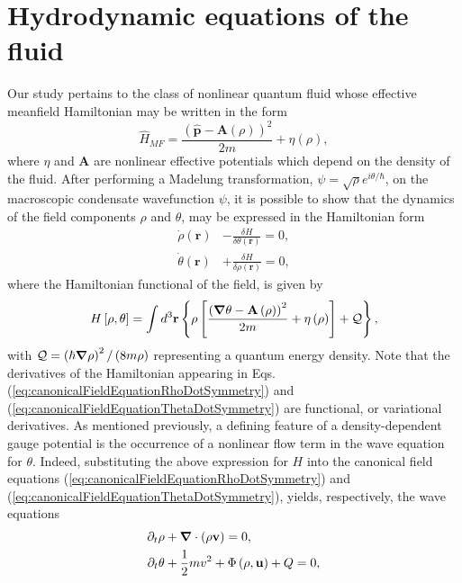 \documentclass[twocolumn, nofootinbib, nobibnotes, amsmath,amssymb,aps, pra, floatfix]{revtex4-1}
\renewcommand{\v}[1]{\ensuremath{\mathbf{#1}}} %
\newcommand{\gv}[1]{\ensuremath{\mbox{\boldmath$ #1 $}}} %
\newcommand{\grad}[1]{\gv{\nabla} #1} %
\renewcommand{\div}[1]{\gv{\nabla} \cdot #1} %
\begin{document}
\section{\label{sec:hydro}Hydrodynamic equations of the fluid}
Our study pertains to the class of nonlinear quantum fluid whose effective meanfield Hamiltonian may be written in the form
\begin{equation}
	\hat{H}_{MF} = \frac{\left( \hat{\v{p}}-\v{A}\left( \rho \right) \right)^2}{2m}+\eta\left( \rho \right),
	\label{eq:meanfieldHamiltonianNonlinearGaugeCoupledQuantumFluid}
\end{equation}
where $\eta$ and $\v{A}$ are nonlinear effective potentials which depend on the density of the fluid.
After performing a Madelung transformation, $\psi=\sqrt{\rho}e^{i\theta/\hbar}$, on the macroscopic condensate wavefunction $\psi$, it is possible to show \cite{buggy2020hydrodynamics} that the dynamics of the field components $\rho$ and $\theta$, may be expressed in the Hamiltonian form 
\begin{align}
  \dot{\rho}\left( \v{r} \right)&-\frac{\delta H}{\delta\theta\left( \v{r} \right)}=0, \label{eq:canonicalFieldEquationRhoDotSymmetry} \\
  \dot{\theta}\left( \v{r} \right)&+\frac{\delta H}{\delta\rho\left( \v{r} \right)}=0, \label{eq:canonicalFieldEquationThetaDotSymmetry}
\end{align}
where the Hamiltonian functional of the field, is given by 
\begin{equation}
	H\left[ \rho,\theta \right]=\int d^3\v{r}\left\{  \rho\left[\frac{\left( \grad{\theta}-\v{A}\left( \rho \right) \right)^2}{2m}+\eta\left( \rho \right)\right]+\mathcal{Q}\right\},
	\label{eq:HamiltonianDensityNonlinearGaugeCoupledQuantumFluid}
\end{equation}
with $\mathcal{Q}=\left(\hbar\grad{\rho}\right)^2/\left( 8m\rho \right)$ representing a quantum energy density.
Note that the derivatives of the Hamiltonian appearing in Eqs. (\ref{eq:canonicalFieldEquationRhoDotSymmetry}) and (\ref{eq:canonicalFieldEquationThetaDotSymmetry}) are functional, or variational derivatives.
As mentioned previously, a defining feature of a density-dependent gauge potential is the occurrence of a nonlinear flow term in the wave equation for $\theta$.
Indeed, substituting the above expression for $H$ into the canonical field equations (\ref{eq:canonicalFieldEquationRhoDotSymmetry}) and (\ref{eq:canonicalFieldEquationThetaDotSymmetry}), yields, respectively, the wave equations
\begin{align}
	\partial_t\rho&+\div{\left(\rho\v{v}\right)}=0, \label{eq:waveEquationRhoNLGCQF} \\
	\partial_t\theta&+\frac{1}{2}mv^2+\Phi\left( \rho,\v{u} \right)+Q=0, \label{eq:waveEquationThetaNLGCQF}
\end{align}
\end{document}
